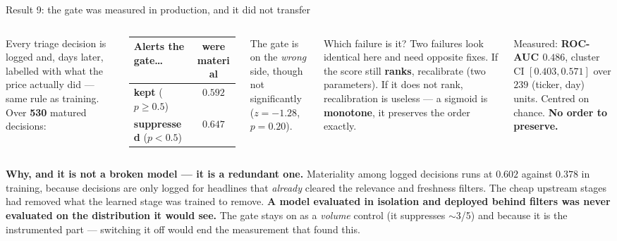 \documentclass[aspectratio=169]{beamer}
\begin{document}
\begin{frame}{Result 9: the gate was measured in production, and it did not transfer}
\begin{columns}[T]
\small
Every triage decision is logged and, days later, labelled with what the price actually did ---
same rule as training. Over \textbf{530} matured decisions:
\medskip

\begin{tabular}{lc}
\toprule
\textbf{Alerts the gate\dots} & \textbf{were material} \\
\midrule
\textbf{kept} ($p \ge 0.5$) & $0.592$ \\
\textbf{suppressed} ($p < 0.5$) & $\mathbf{0.647}$ \\
\bottomrule
\end{tabular}
\medskip

{\footnotesize The gate is on the \emph{wrong} side, though not significantly
($z=-1.28$, $p=0.20$).}

\begin{block}{\small Which failure is it?}
\small Two failures look identical here and need opposite fixes. If the score still
\textbf{ranks}, recalibrate (two parameters). If it does not rank, recalibration is useless ---
a sigmoid is \textbf{monotone}, it preserves the order exactly.
\end{block}
\smallskip
{\footnotesize Measured: \textbf{ROC-AUC $0.486$}, cluster CI $[0.403, 0.571]$ over $239$
(ticker, day) units. Centred on chance. \textbf{No order to preserve.}}
\end{columns}
\vfill
{\footnotesize\textbf{Why, and it is not a broken model --- it is a redundant one.} Materiality
among logged decisions runs at $0.602$ against $0.378$ in training, because decisions are only
logged for headlines that \emph{already} cleared the relevance and freshness filters. The cheap
upstream stages had removed what the learned stage was trained to remove. \textbf{A model
evaluated in isolation and deployed behind filters was never evaluated on the distribution it
would see.} The gate stays on as a \emph{volume} control (it suppresses $\sim$3/5) and because it
is the instrumented part --- switching it off would end the measurement that found this.}
\end{frame}
\end{document}
